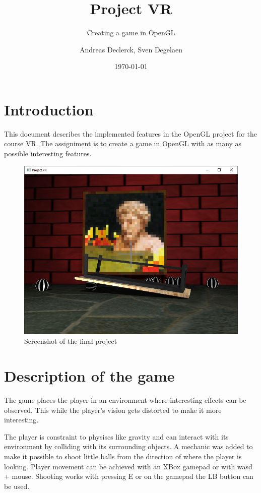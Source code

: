 \documentclass[]{article}
\title{Project VR}
\subtitle{Creating a game in OpenGL}
\author{Andreas Declerck, Sven Degelaen}
\date{\today}
\begin{document}
\maketitle

\section{Introduction}

This document describes the implemented features in the OpenGL project for the
course VR. The assigniment is to create a game in OpenGL with as many as possible
interesting features.

\begin{figure}[h!]
      \centering
      \includegraphics[width=\textwidth]{screenshot.png}
      \caption{Screenshot of the final project}
      \label{fig:screenshot}
\end{figure}

\section{Description of the game}

The game places the player in an environment where interesting effects can be
observed. This while the player's vision gets distorted to make it more
interesting.

The player is constraint to physiscs like gravity and can interact with its
environment by colliding with its surrounding objects. A mechanic was added
to make it possible to shoot little balls from the direction of where the
player is looking. Player movement can be achieved with an XBox gamepad or with
wasd + mouse. Shooting works with pressing E or on the gamepad the LB
button can be used.
\end{document}
